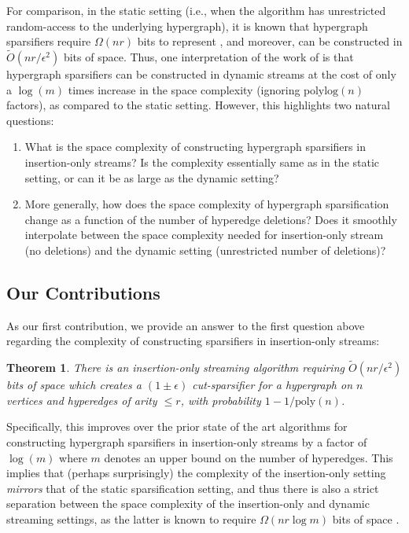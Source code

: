 \documentclass[11pt]{article}
\newtheorem{theorem}{Theorem}[section]
\theoremstyle{definition}
\newcommand{\eps}{\epsilon}
\newcommand{\polylog}{\mathrm{polylog}}
\begin{document}
For comparison, in the static setting (i.e., when the algorithm has unrestricted random-access to the underlying hypergraph), it is known that hypergraph sparsifiers require $\Omega(nr)$ bits to represent \cite{KKTY21a, KKTY21b}, and moreover, can be constructed in $\widetilde{O}(nr / \eps^2)$ bits of space. Thus, one interpretation of the work of \cite{KPS24d} is that hypergraph sparsifiers can be constructed in dynamic streams at the cost of only a $\log(m)$ times increase in the space complexity (ignoring $\polylog(n)$ factors), as compared to the static setting. However, this highlights two natural questions: 
\begin{enumerate}
    \item What is the space complexity of constructing hypergraph sparsifiers in insertion-only streams? Is the complexity essentially same as in the static setting, or can it be as large as the dynamic setting?
    \item More generally, how does the space complexity of hypergraph sparsification change as a function of the number of hyperedge deletions? Does it smoothly interpolate between the space complexity needed for insertion-only stream (no deletions) and the dynamic setting (unrestricted number of deletions)?
\end{enumerate}

\subsection{Our Contributions}

As our first contribution, we provide an answer to the first question above regarding the complexity of constructing sparsifiers in insertion-only streams:

\begin{theorem}\label{thm:insertionOnlyintro}
	There is an insertion-only streaming algorithm requiring $\widetilde{O}(n r / \eps^2)$ bits of space which creates a $(1 \pm \eps)$ cut-sparsifier for a hypergraph on $n$ vertices and hyperedges of arity $\leq r$, with probability $1 - 1 / \mathrm{poly}(n)$.
\end{theorem}

Specifically, this improves over the prior state of the art algorithms for constructing hypergraph sparsifiers in insertion-only streams by a factor of $\log(m)$ where $m$ denotes an upper bound on the number of hyperedges. This implies that (perhaps surprisingly) the complexity of the insertion-only setting \emph{mirrors} that of the static sparsification setting, and thus there is also a strict separation between the space complexity of the insertion-only and dynamic streaming settings, as the latter is known to require $\Omega(nr\log m)$ bits of space \cite{KPS24d}.
\end{document}
